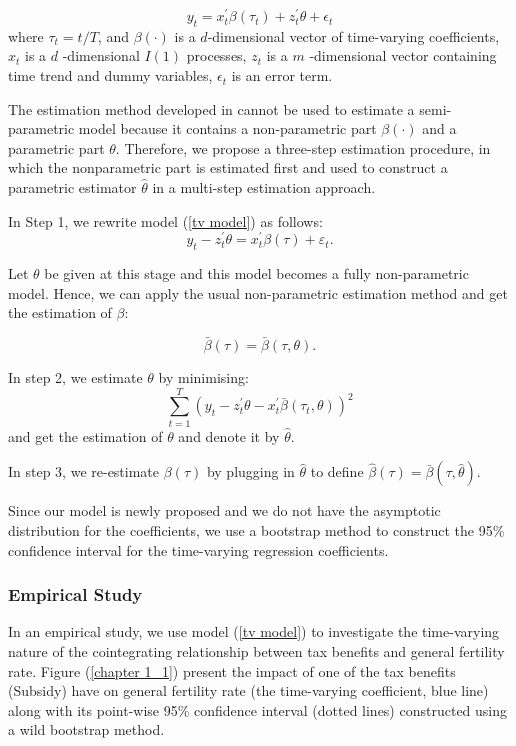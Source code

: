 \documentclass[a4paper,12pt,times,numbered,print,index]{report}
\numberwithin{equation}{section}
\begin{document}
	\begin{equation}
		y_{t}=x_{t}^{\prime} \beta\left(\tau_{t}\right)+z_{t}^{\prime} \theta+\epsilon_{t}
		\label{tv model}
	\end{equation}
	where $\tau _{t}=t/T$, and $\beta \left(
	\cdot \right) $ is a $d$-dimensional vector of time-varying coefficients, $x_{t}$ is a $d$%
	-dimensional $I\left( 1\right) $ processes, $z_{t}$ is a $m$%
	-dimensional vector containing time trend and dummy variables, $\epsilon _{t}$ is an error term.
	
	The estimation method developed in \cite{phillips2017estimating} cannot be used to estimate a semi-parametric model because it contains a non-parametric part $\beta \left( \cdot \right) $ and a parametric part $\theta .$ Therefore, we propose a three-step estimation procedure, in which the nonparametric part is estimated first and used to construct a parametric estimator $\hat{\theta}$ in a multi-step estimation approach.
	
	In Step 1, we rewrite model (\ref{tv model}) as follows:
	\[
	y_{t}-z_{t}^{\prime }\theta =x_{t}^{\prime }\beta \left( \tau \right) +\varepsilon _{t}. 
	\]%
	
	Let $\theta $ be given at this stage and this model becomes a fully non-parametric model. Hence, we can apply the usual non-parametric estimation method and get the estimation of $\beta$:
	
	\[
	\bar{\beta}\left( \tau \right) =\bar{\beta}\left( \tau ,\theta \right). 
	\]
	
	In step 2, we estimate $\theta $ by minimising:
	\[
	\sum_{t=1}^{T}\left( y_{t}-z_{t}^{\prime }\theta -x_{t}^{\prime }\bar{\beta}%
	\left( \tau _{t},\theta \right) \right) ^{2} 
	\]%
	and get the estimation of $\theta$ and denote it by $\hat{\theta}$.
	
	In step 3, we re-estimate $\beta \left( \tau \right) $ by plugging in $\widehat{\theta}$ to define $\widehat{\beta}\left( \tau \right) =\bar{\beta}\left( \tau ,\widehat{\theta}\right)$. 
	
	Since our model is newly proposed and we do not have the asymptotic distribution for the coefficients, we use a bootstrap method to construct the 95\% confidence interval for the time-varying regression coefficients. 
	
	\subsubsection*{Empirical Study}
	In an empirical study, we use model (\ref{tv model}) to investigate the time-varying nature of the cointegrating relationship between tax benefits and general fertility rate. Figure (\ref{chapter 1_1}) present the impact of one of the tax benefits (Subsidy) have on general fertility rate (the time-varying coefficient, blue line) along with its point-wise 95\% confidence interval (dotted lines) constructed using a wild bootstrap method.
	
\end{document}
